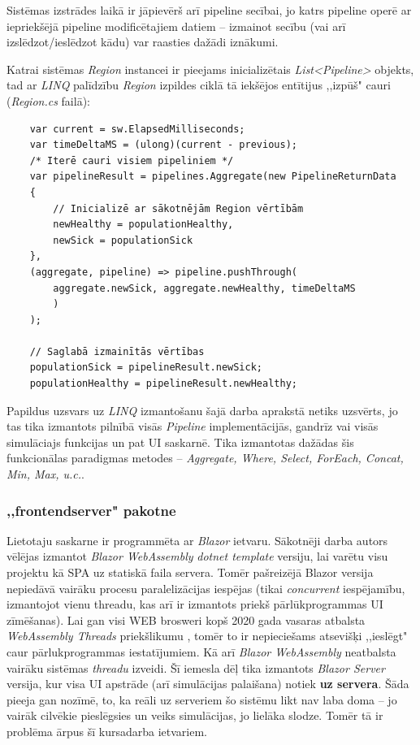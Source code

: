 Sistēmas izstrādes laikā ir jāpievērš arī pipeline secībai, jo katrs pipeline
operē ar iepriekšējā pipeline modificētajiem datiem -- izmainot secību
(vai arī izslēdzot/ieslēdzot kādu) var raasties dažādi iznākumi.

Katrai sistēmas \emph{Region} instancei ir pieejams inicializētais \emph{List<Pipeline>}
objekts, tad ar \emph{LINQ} palīdzību \emph{Region} izpildes ciklā tā iekšējos entītijus
,,izpūš" cauri (\emph{Region.cs} failā):

{
\begin{verbatim}
    var current = sw.ElapsedMilliseconds;
    var timeDeltaMS = (ulong)(current - previous);
    /* Iterē cauri visiem pipeliniem */
    var pipelineResult = pipelines.Aggregate(new PipelineReturnData
    {
        // Inicializē ar sākotnējām Region vērtībām
        newHealthy = populationHealthy,
        newSick = populationSick
    },
    (aggregate, pipeline) => pipeline.pushThrough(
        aggregate.newSick, aggregate.newHealthy, timeDeltaMS
        )
    );

    // Saglabā izmainītās vērtības
    populationSick = pipelineResult.newSick;
    populationHealthy = pipelineResult.newHealthy;
\end{verbatim}
}

Papildus uzsvars uz \emph{LINQ} izmantošanu šajā darba aprakstā netiks uzsvērts,
jo tas tika izmantots pilnībā visās \emph{Pipeline} implementācijās, gandrīz vai
visās simulāciajs funkcijas un pat UI saskarnē. Tika izmantotas dažādas šis
funkcionālas paradigmas metodes -- \emph{Aggregate, Where, Select, ForEach, Concat, Min, Max, u.c.}.


\subsubsection{,,frontendserver" pakotne}


Lietotaju saskarne ir programmēta ar \emph{Blazor} ietvaru. Sākotnēji darba
autors vēlējas izmantot \emph{Blazor WebAssembly} \emph{dotnet template} versiju,
lai varētu visu projektu kā SPA\cite{progr:SPA} uz statiskā faila servera. Tomēr
pašreizējā Blazor versija nepiedāvā vairāku procesu paralelizācijas iespējas
(tikai \emph{concurrent} iespējamību, izmantojot vienu threadu, kas arī ir
izmantots priekš pārlūkprogrammas UI zīmēšanas)\cite{csharp:blazor-no-multithreaded-support}. Lai gan
visi WEB brosweri kopš 2020 gada vasaras atbalsta \emph{WebAssembly Threads}
priekšlikumu \cite{wasm:threads-proposal}, tomēr to ir nepieciešams atsevišķi
,,ieslēgt" caur pārlukprogrammas iestatījumiem. Kā arī \emph{Blazor WebAssembly} neatbalsta vairāku
sistēmas \emph{threadu} izveidi. Šī iemesla dēļ tika izmantots \emph{Blazor Server}
versija, kur visa UI apstrāde (arī simulācijas palaišana) notiek \textbf{uz servera}. Šāda
pieeja gan nozīmē, to, ka reāli uz serveriem šo sistēmu likt nav laba doma -- jo
vairāk cilvēkie pieslēgsies un veiks simulācijas, jo lielāka slodze. Tomēr tā ir
problēma ārpus šī kursadarba ietvariem.

